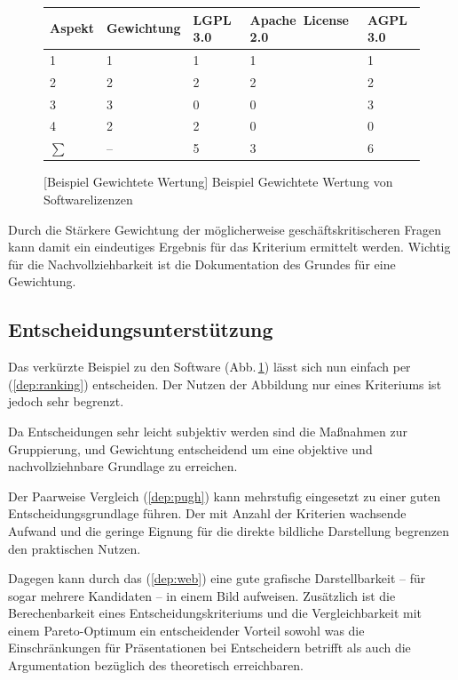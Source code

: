 \begin{figure}[!htp]
\centering
\begin{tabular}{l|llll}
Aspekt	& Gewichtung & LGPL\,3.0 	& Apache~License\,2.0 & AGPL\,3.0 \\
\hline
\hline
1 		& 1	& 1	& 1	& 1	\\
\hline
2 		& 2	& 2	& 2	& 2	\\
\hline
3 		& 3	& 0	& 0	& 3	\\
\hline
4		& 2	& 2 & 0 & 0 \\
\hline
\hline
\(\sum\)& --& 5 & 3 & 6 \\
\end{tabular}
[Beispiel Gewichtete Wertung]{\label{abb:wertung:oss2} Beispiel Gewichtete Wertung von Softwarelizenzen}
\end{figure}

Durch die Stärkere Gewichtung der möglicherweise geschäftskritischeren Fragen kann damit ein eindeutiges Ergebnis für das Kriterium ermittelt werden.
Wichtig für die Nachvollziehbarkeit ist die Dokumentation des Grundes für eine Gewichtung.

\subsection{Entscheidungsunterstützung}

Das verkürzte Beispiel zu den Software (Abb.\,\ref{abb:wertung:oss2}) lässt sich nun einfach per  (\ref{dep:ranking}) entscheiden.
Der Nutzen der Abbildung nur eines Kriteriums ist jedoch sehr begrenzt.

Da Entscheidungen sehr leicht subjektiv werden sind die Maßnahmen zur Gruppierung,  und Gewichtung entscheidend um
eine objektive und nachvollziehnbare Grundlage zu erreichen.

Der Paarweise Vergleich (\ref{dep:pugh}) kann mehrstufig eingesetzt zu einer guten Entscheidungsgrundlage führen.
Der mit Anzahl der Kriterien wachsende Aufwand und die geringe Eignung für die direkte bildliche Darstellung begrenzen den praktischen Nutzen.

Dagegen kann durch das  (\ref{dep:web}) eine gute grafische Darstellbarkeit -- für sogar mehrere Kandidaten -- in einem Bild aufweisen.
Zusätzlich ist die Berechenbarkeit eines Entscheidungskriteriums und die Vergleichbarkeit mit einem Pareto-Optimum ein entscheidender Vorteil sowohl was die Einschränkungen für Präsentationen bei Entscheidern betrifft als auch die Argumentation bezüglich des theoretisch erreichbaren.
